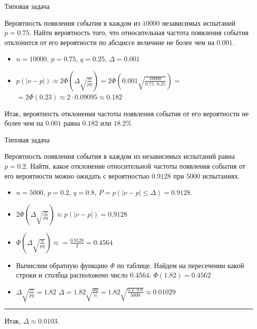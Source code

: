 \documentclass[unicode,11pt,notheorems,xcolor=table]{beamer}
\begin{document}
\begin{frame}{Типовая задача}
    \begin{exampleblock}{}
    Вероятность появления события в каждом из $10000$ независимых испытаний $p = 0.75$. Найти вероятность того, что относительная частота появления события отклонится от его вероятности по абсциссе величине не более чем на $0.001$.
    \end{exampleblock}
    
    \bigskip
    \begin{itemize}
        \item $n=10000$, $p=0.75$, $q=0.25$, $\Delta=0.001$
        \item $p(|\nu-p|) \approx 2\Phi\left(\Delta\sqrt{\frac{n}{pq}}\right) 
        = 2\Phi \left(0.001\sqrt{\frac{10000}{0.75\cdot 0.25}}\right) 
        =$ $=2\Phi(0.23)\approx 2\cdot 0.09095 \approx 0.182$
    \end{itemize}
    Итак, вероятность отклонения частоты появления события от его вероятности  не более чем на $0.001$ равна $0.182$ или $18.2\%$
\end{frame}
\begin{frame}{Типовая задача}
    \begin{exampleblock}{}
        Вероятность появления события в каждом из независимых испытаний равна $p=0.2$. Найти, какое отклонение относительной частоты появления события от его вероятности можно ожидать с вероятностью $0.9128$ при $5000$ испытаниях.
    \end{exampleblock}
    \bigskip
    \begin{itemize}
        \item $n=5000$, $p=0.2$, $q=0.8$, $P=p(|\nu-p|\leqslant \Delta)=0.9128$.
        \item $2\Phi\left(\Delta\sqrt{\frac{n}{pq}}\right) \approx  p(|\nu-p|) = 0.9128$
        \item $\Phi\left(\Delta\sqrt{\frac{n}{pq}}\right) \approx  = \frac{0.9128}{2}=0.4564$
        \item Вычислим обратную функцию $\Phi$ по таблице. Найдем на пересечении какой строки и столбца расположено число $0.4564$: $\Phi(1.82)=0.4562$
        \item $\Delta\sqrt{\frac{n}{pq}}=1.82$ \qquad\hfill $\Delta = 1.82\sqrt{\frac{pq}{n}}=1.82\sqrt{\frac{0.2\cdot 0.8 }{5000}}\approx 0.01029$
    \end{itemize}
    \hrule
    \smallskip
    Итак, $\Delta\approx 0.0103$.

\end{frame}
\end{document}
